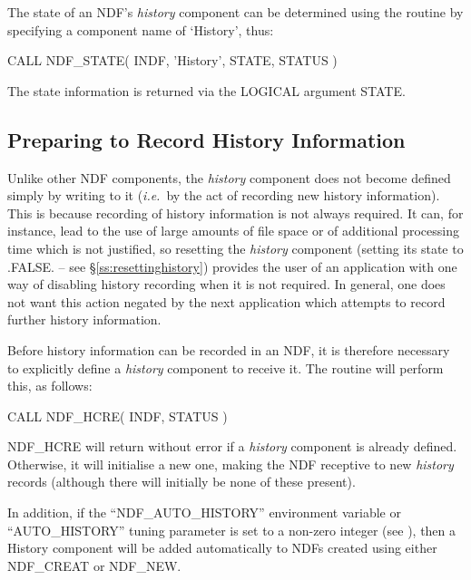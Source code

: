 \documentclass[twoside,11pt,nolof]{starlink}
\providecommand{\st}[1]{{\emph{#1}}}
\begin{document}
The state of an NDF's \st{history\/} component can be determined using
the  routine by specifying a component name of `History',
thus:

\small
\begin{terminalv}
      CALL NDF_STATE( INDF, 'History', STATE, STATUS )
\end{terminalv}
\normalsize

The state information is returned via the LOGICAL argument STATE.

\subsection{\label{ss:historycreation}Preparing to Record History Information}

Unlike other NDF components, the \st{history\/} component does not
become defined simply by writing to it (\st{i.e.}\ by the act of
recording new history information). This is because recording of
history information is not always required.  It can, for instance,
lead to the use of large amounts of file space or of additional
processing time which is not justified, so resetting the \st{history\/}
component (setting its state to .FALSE. -- see
\S\ref{ss:resettinghistory}) provides the user of an application with
one way of disabling history recording when it is not required.
In general, one does not want this action negated by the next
application which attempts to record further history information.

Before history information can be recorded in an NDF, it is therefore
necessary to explicitly define a \st{history\/} component to receive it.
The  routine will perform this, as follows:

\small
\begin{terminalv}
      CALL NDF_HCRE( INDF, STATUS )
\end{terminalv}
\normalsize

NDF\_HCRE will return without error if a \st{history\/} component is
already defined. Otherwise, it will initialise a new one, making the
NDF receptive to new \st{history\/} records (although there will
initially be none of these present).

In addition, if the ``NDF\_AUTO\_HISTORY'' environment variable or
``AUTO\_HISTORY'' tuning parameter is set to a non-zero integer (see
), then a History component will be added
automatically to NDFs created using either NDF\_CREAT or NDF\_NEW.
\end{document}
